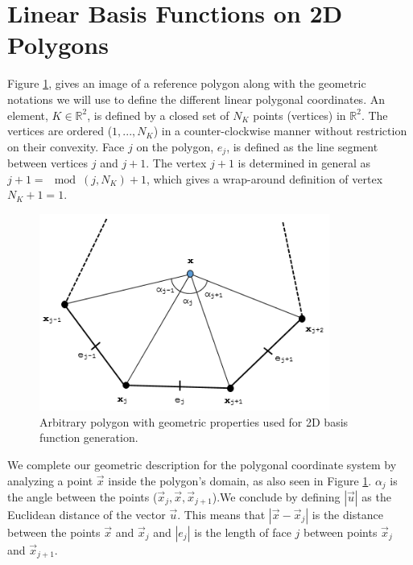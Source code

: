 \section{Linear Basis Functions on 2D Polygons}
\label{sec::BF_2DLinear}

Figure \ref{fig::BF_2D_ref_polygon}, gives an image of a reference polygon along with the geometric notations we will use to define the different linear polygonal coordinates. An element, $K\in \mathbb{R}^2$, is defined by a closed set of $N_K$ points (vertices) in $\mathbb{R}^2$. The vertices are ordered ($1,...,N_K$) in a counter-clockwise manner without restriction on their convexity. Face $j$ on the polygon, $e_j$, is defined as the line segment between vertices $j$ and $j+1$. The vertex $j+1$ is determined in general as $j+1 =\mod(j,N_K)+1$, which gives a wrap-around definition of vertex $N_K+1 = 1$.

\begin{figure}
\centering
\includegraphics[width=0.85\textwidth]{figures/sec_BF/ref_polygon_Rev1.png}
\caption{Arbitrary polygon with geometric properties used for 2D basis function generation.}
\label{fig::BF_2D_ref_polygon}
\end{figure}

We complete our geometric description for the polygonal coordinate system by analyzing a point $\vec{x}$ inside the polygon's domain, as also seen in Figure \ref{fig::BF_2D_ref_polygon}. $\alpha_j$ is the angle between the points ($\vec{x}_j, \vec{x}, \vec{x}_{j+1}$).We conclude by defining $|\vec{u}|$ as the Euclidean distance of the vector $\vec{u}$. This means that $|\vec{x} - \vec{x}_j|$ is the distance between the points $\vec{x}$ and $\vec{x}_j$ and $|e_j|$ is the length of face $j$ between points $\vec{x}_j$ and $\vec{x}_{j+1}$.


